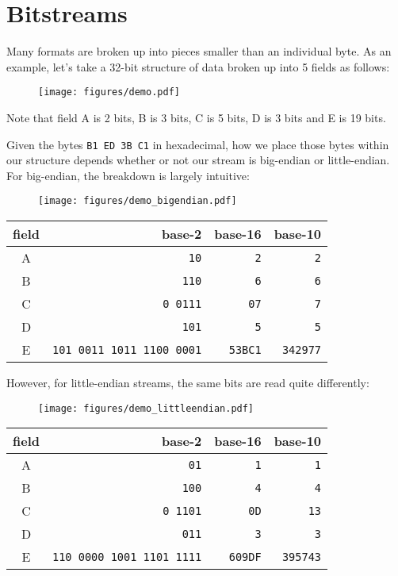 \section{Bitstreams}
\label{bitstreams}
Many formats are broken up into pieces smaller than an individual byte.
As an example, let's take a 32-bit structure of data broken up into 5
fields as follows:
\begin{figure}[h]
\texttt{[image: figures/demo.pdf]}
\end{figure}
\par
\noindent
Note that field A is 2 bits, B is 3 bits, C is 5 bits, D is 3 bits
and E is 19 bits.
\par
Given the bytes \texttt{B1 ED 3B C1} in hexadecimal,
how we place those bytes within our structure depends
whether or not our stream is big-endian or little-endian.
For big-endian, the breakdown is largely intuitive:
\begin{figure}[h]
\texttt{[image: figures/demo\_bigendian.pdf]}
\end{figure}
\par
\noindent
\begin{tabular}{c r r r}
field & base-2 & base-16 & base-10 \\
\hline
A & \texttt{10} & \texttt{2} & \texttt{2} \\
B & \texttt{110} & \texttt{6} & \texttt{6} \\
C & \texttt{0 0111} & \texttt{07} & \texttt{7} \\
D & \texttt{101} & \texttt{5} & \texttt{5} \\
E & \texttt{101 0011 1011 1100 0001} & \texttt{53BC1} & \texttt{342977} \\
\end{tabular}
\par
\noindent
However, for little-endian streams, the same bits are read quite differently:
\begin{figure}[h]
\texttt{[image: figures/demo\_littleendian.pdf]}
\end{figure}
\par
\noindent
\begin{tabular}{c r r r}
field & base-2 & base-16 & base-10 \\
\hline
A & \texttt{01} & \texttt{1} & \texttt{1} \\
B & \texttt{100} & \texttt{4} & \texttt{4} \\
C & \texttt{0 1101} & \texttt{0D} & \texttt{13} \\
D & \texttt{011} & \texttt{3} & \texttt{3} \\
E & \texttt{110 0000 1001 1101 1111} & \texttt{609DF} & \texttt{395743} \\
\end{tabular}
